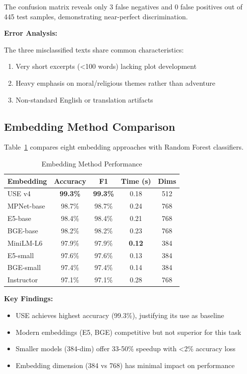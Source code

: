 \documentclass[12pt,a4paper]{article}
\begin{document}
The confusion matrix reveals only 3 false negatives and 0 false positives out of 445 test samples, demonstrating near-perfect discrimination.

\textbf{Error Analysis:}

The three misclassified texts share common characteristics:
\begin{enumerate}
    \item Very short excerpts (<100 words) lacking plot development
    \item Heavy emphasis on moral/religious themes rather than adventure
    \item Non-standard English or translation artifacts
\end{enumerate}

\subsection{Embedding Method Comparison}

Table~\ref{tab:embeddings} compares eight embedding approaches with Random Forest classifiers.

\begin{table}[h]
\centering
\caption{Embedding Method Performance}
\label{tab:embeddings}
\begin{tabular}{lcccc}
\toprule
\textbf{Embedding} & \textbf{Accuracy} & \textbf{F1} & \textbf{Time (s)} & \textbf{Dims} \\
\midrule
USE v4 & \textbf{99.3\%} & \textbf{99.3\%} & 0.18 & 512 \\
MPNet-base & 98.7\% & 98.7\% & 0.24 & 768 \\
E5-base & 98.4\% & 98.4\% & 0.21 & 768 \\
BGE-base & 98.2\% & 98.2\% & 0.23 & 768 \\
MiniLM-L6 & 97.9\% & 97.9\% & \textbf{0.12} & 384 \\
E5-small & 97.6\% & 97.6\% & 0.13 & 384 \\
BGE-small & 97.4\% & 97.4\% & 0.14 & 384 \\
Instructor & 97.1\% & 97.1\% & 0.28 & 768 \\
\bottomrule
\end{tabular}
\end{table}

\textbf{Key Findings:}
\begin{itemize}
    \item USE achieves highest accuracy (99.3\%), justifying its use as baseline
    \item Modern embeddings (E5, BGE) competitive but not superior for this task
    \item Smaller models (384-dim) offer 33-50\% speedup with <2\% accuracy loss
    \item Embedding dimension (384 vs 768) has minimal impact on performance
\end{itemize}
\end{document}
